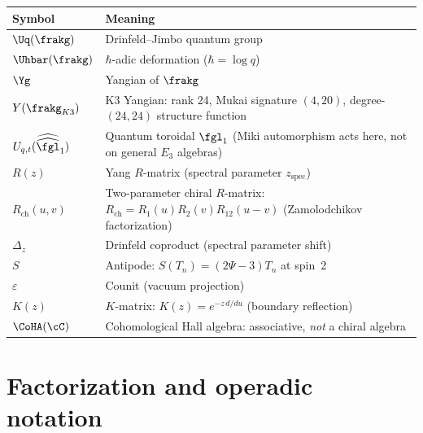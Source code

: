 \begin{center}
\begin{tabular}{@{}lp{8cm}@{}}
\toprule
\textbf{Symbol} & \textbf{Meaning} \\
\midrule
$\Uq(\frakg)$ & Drinfeld--Jimbo quantum group \\
$\Uhbar(\frakg)$ & $\hbar$-adic deformation ($\hbar = \log q$) \\
$\Yg$ & Yangian of $\frakg$ \\
$Y(\frakg_{K3})$ & K3 Yangian: rank 24, Mukai signature $(4,20)$,
 degree-$(24,24)$ structure function \\
$U_{q,t}(\widehat{\widehat{\fgl}}_1)$ & Quantum toroidal
 $\fgl_1$ (Miki automorphism acts here, not on general
 $E_3$ algebras) \\
$R(z)$ & Yang $R$-matrix (spectral parameter $z_{\mathrm{spec}}$) \\
$R_{\mathrm{ch}}(u,v)$ & Two-parameter chiral $R$-matrix:
 $R_{\mathrm{ch}} = R_1(u) R_2(v) R_{12}(u-v)$
 (Zamolodchikov factorization) \\
$\Delta_z$ & Drinfeld coproduct (spectral parameter shift) \\
$S$ & Antipode: $S(T_n) = (2\Psi - 3)T_n$ at spin~2 \\
$\varepsilon$ & Counit (vacuum projection) \\
$K(z)$ & $K$-matrix: $K(z) = e^{-z\, d/du}$ (boundary reflection) \\
$\CoHA(\cC)$ & Cohomological Hall algebra: associative, \emph{not}
 a chiral algebra \\
\bottomrule
\end{tabular}
\end{center}

\section{Factorization and operadic notation}
\label{sec:nc-fact}

